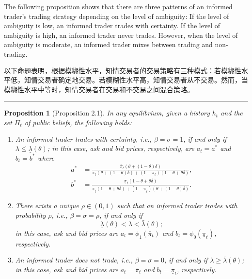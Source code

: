 \documentclass[12pt,a4paper]{article}
\newenvironment{original}{%
  \par\vspace{4pt}\noindent%
  \color{black}%
  \ignorespaces
}{%
  \par\vspace{2pt}%
}
\newenvironment{translation}{%
  \par\vspace{2pt}\noindent%
  \color{transblue}%
  \ignorespaces
}{%
  \par\vspace{4pt}\hrule\vspace{6pt}%
}
\newtheorem{proposition}[theorem]{Proposition}
\begin{document}
\begin{original}
The following proposition shows that there are three patterns of an informed trader's trading strategy depending on the level of ambiguity: If the level of ambiguity is low, an informed trader trades with certainty. If the level of ambiguity is high, an informed trader never trades. However, when the level of ambiguity is moderate, an informed trader mixes between trading and non-trading.
\end{original}
\begin{translation}
以下命题表明，根据模糊性水平，知情交易者的交易策略有三种模式：若模糊性水平低，知情交易者确定地交易。若模糊性水平高，知情交易者从不交易。然而，当模糊性水平中等时，知情交易者在交易和不交易之间混合策略。
\end{translation}

\begin{proposition}[Proposition 2.1]
In any equilibrium, given a history $h_t$ and the set $\Pi_t$ of public beliefs, the following holds:
\begin{enumerate}[label=(\roman*)]
\item An informed trader trades with certainty, i.e., $\beta = \sigma = 1$, if and only if $\lambda \leq \underline{\lambda}(\theta)$; in this case, ask and bid prices, respectively, are $a_t = a^*$ and $b_t = b^*$ where
\begin{align}
a^* &= \frac{\bar{\pi}_t(\theta + (1-\theta)\delta)}{\bar{\pi}_t(\theta + (1-\theta)\delta) + (1-\bar{\pi}_t)(1-\theta+\theta\delta)}, \tag{2.5}\\
b^* &= \frac{\underline{\pi}_t(1-\theta + \theta\delta)}{\underline{\pi}_t(1-\theta + \theta\delta) + (1-\underline{\pi}_t)(\theta+(1-\theta)\delta)}. \tag{2.6}
\end{align}
\item There exists a unique $\rho \in (0, 1)$ such that an informed trader trades with probability $\rho$, i.e., $\beta = \sigma = \rho$, if and only if
\[
\underline{\lambda}(\theta) < \lambda < \bar{\lambda}(\theta); \tag{2.7}
\]
in this case, ask and bid prices are $a_t = \phi_1(\bar{\pi}_t)$ and $b_t = \phi_0(\underline{\pi}_t)$, respectively.
\item An informed trader does not trade, i.e., $\beta = \sigma = 0$, if and only if $\lambda \geq \bar{\lambda}(\theta)$; in this case, ask and bid prices are $a_t = \bar{\pi}_t$ and $b_t = \underline{\pi}_t$, respectively.
\end{enumerate}
\end{proposition}
\end{document}
